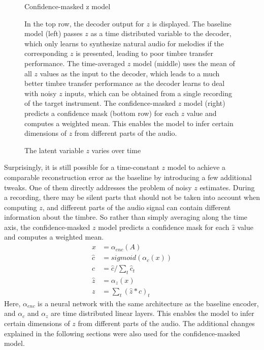 \begin{figure}
\begin{minipage}[b]{0.3\textwidth}
        \small Confidence-masked z model
    \end{minipage}
    \caption{The latent variable $z$ varies over time} 
    \small In the top row, the decoder output for $z$ is displayed. The baseline model (left) passes $z$ as a time distributed variable to the decoder, which only learns to synthesize natural audio for melodies if the corresponding $z$ is presented, leading to poor timbre transfer performance.
    The time-averaged $z$ model (middle) uses the mean of all $z$ values as the input to the decoder, which leads to a much better timbre transfer performance as the decoder learns to deal with noisy $z$ inputs, which can be obtained from a single recording of the target instrument.
    The confidence-masked $z$ model (right) predicts a confidence mask (bottom row) for each $z$ value and computes a weighted mean. This enables the model to infer certain dimensions of $z$ from different parts of the audio.
    \label{fig:baseline-z-t}
\end{figure}

Surprisingly, it is still possible for a time-constant $z$ model to achieve a comparable reconstruction error as the baseline by introducing a few additional tweaks. One of them directly addresses the problem of noisy $z$ estimates. During a recording, there may be silent parts that should not be taken into account when computing $z$, and different parts of the audio signal can contain different information about the timbre. \newline
So rather than simply averaging along the time axis, the confidence-masked $z$ model predicts a confidence mask for each $\hat{z}$ value and computes a weighted mean.
\begin{equation}
    \begin{split}
        x &= \alpha_{enc}(A) \\
        \hat{c} &= sigmoid(\alpha_c(x)) \\
        c &= \hat{c} / \sum_t \hat{c}_t \\
        \hat{z} &= \alpha_z(x) \\
        z &= \sum_t (\hat{z} * c)_t
    \end{split}
\end{equation}
Here, $\alpha_{enc}$ is a neural network with the same architecture as the baseline encoder, and $\alpha_c$ and $\alpha_z$ are time distributed linear layers.
This enables the model to infer certain dimensions of $z$ from different parts of the audio.
The additional changes explained in the following sections were also used for the confidence-masked model.


